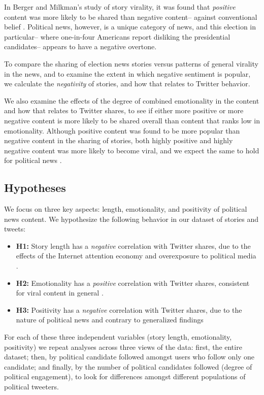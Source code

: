 \documentclass[letterpaper]{article}
\begin{document}
In Berger and Milkman’s study of story virality, it was found that \emph{positive} content was more likely to be shared than negative content-- against conventional belief \cite{berger2012makes}. Political news, however, is a unique category of news, and this election in particular-- where one-in-four Americans report disliking the presidential candidates-- appears to have a negative overtone.

To compare the sharing of election news stories versus patterns of general virality in the news, and to examine the extent in which negative sentiment is popular, we calculate the \emph{negativity} of stories, and how that relates to Twitter behavior.

We also examine the effects of the degree of combined emotionality in the content and how that relates to Twitter shares, to see if either more positive or more negative content is more likely to be shared overall than content that ranks low in emotionality. Although positive content was found to be more popular than negative content in the sharing of stories, both highly positive and highly negative content was more likely to become viral, and we expect the same to hold for political news \cite{berger2012makes}. 

\subsection{Hypotheses}

 We focus on three key aspects: length, emotionality, and positivity of political news content. We hypothesize the following behavior in our dataset of stories and tweets:

\begin{itemize} 
    \item \textbf{H1:} Story length has a \emph{negative} correlation with Twitter shares, due to the effects of the Internet attention economy and overexposure to political media \cite{goldhaber1997attention}.
    \item \textbf{H2:} Emotionality has a \emph{positive} correlation with Twitter shares, consistent for viral content in general \cite{berger2012makes}.
    \item \textbf{H3:} Positivity has a \emph{negative} correlation with Twitter shares, due to the nature of political news and contrary to generalized findings \cite{berger2012makes}

\end{itemize}

For each of these three independent variables (story length, emotionality, positivity) we repeat analyses across three views of the data: first, the entire dataset; then, by political candidate followed amongst users who follow only one candidate; and finally, by the number of political candidates followed (degree of political engagement), to look for differences amongst different populations of political tweeters.
\end{document}
